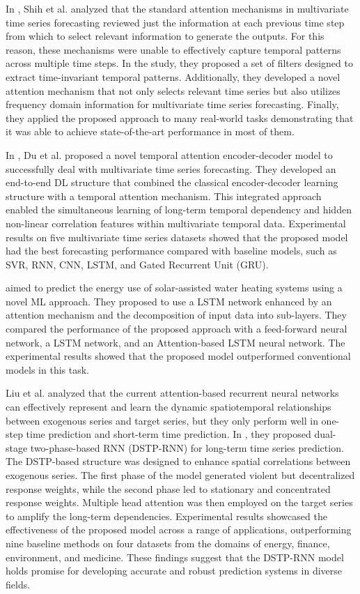 In \cite{Shih2019}, Shih et al. analyzed that the standard attention mechanisms in multivariate time series forecasting reviewed just the information at each previous time step from which to select relevant information to generate the outputs.
For this reason, these mechanisms were unable to effectively capture temporal patterns across multiple time steps.
In the study, they proposed a set of filters designed to extract time-invariant temporal patterns.
Additionally, they developed a novel attention mechanism that not only selects relevant time series but also utilizes frequency domain information for multivariate time series forecasting.
Finally, they applied the proposed approach to many real-world tasks demonstrating that it was able to achieve state-of-the-art performance in most of them.

In \cite{DU2020269}, Du et al. proposed a novel temporal attention encoder-decoder model to successfully deal with multivariate time series forecasting.
They developed an end-to-end DL structure that combined the classical encoder-decoder learning structure with a temporal attention mechanism.
This integrated approach enabled the simultaneous learning of long-term temporal dependency and hidden non-linear correlation features within multivariate temporal data.
Experimental results on five multivariate time series datasets showed that the proposed model had the best forecasting performance compared with baseline models, such as SVR, RNN, CNN, LSTM, and Gated Recurrent Unit (GRU).

\cite{HEIDARI2020626} aimed to predict the energy use of solar-assisted water heating systems using a novel ML approach.
They proposed to use a LSTM network enhanced by an attention mechanism and the decomposition of input data into sub-layers.
They compared the performance of the proposed approach with a feed-forward neural network, a LSTM network, and an Attention-based LSTM neural network.
The experimental results showed that the proposed model outperformed conventional models in this task.

Liu et al. analyzed that the current attention-based recurrent neural networks can effectively represent and learn the dynamic spatiotemporal relationships between exogenous series and target series, but they only perform well in one-step time prediction and short-term time prediction.
In \cite{LIU2020113082}, they proposed dual-stage two-phase-based RNN (DSTP-RNN) for long-term time series prediction.
The DSTP-based structure was designed to enhance spatial correlations between exogenous series.
The first phase of the model generated violent but decentralized response weights, while the second phase led to stationary and concentrated response weights.
Multiple head attention was then employed on the target series to amplify the long-term dependencies.
Experimental results showcased the effectiveness of the proposed model across a range of applications, outperforming nine baseline methods on four datasets from the domains of energy, finance, environment, and medicine.
These findings suggest that the DSTP-RNN model holds promise for developing accurate and robust prediction systems in diverse fields.


